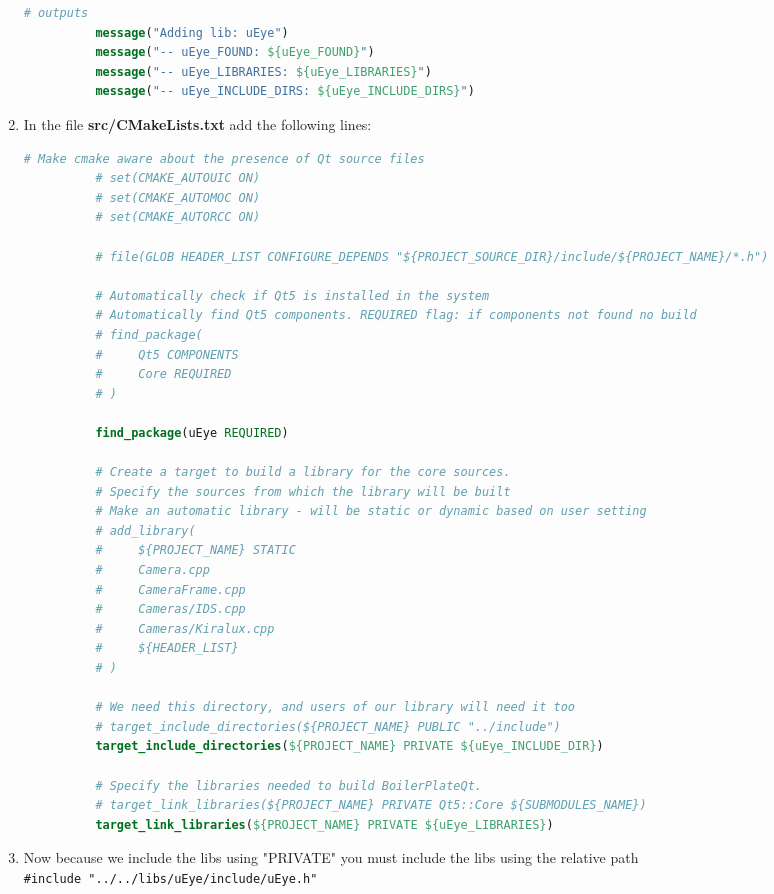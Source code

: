 \begin{enumerate}
\begin{lstlisting}[language=cmake, gobble=10]
          # outputs
          message("Adding lib: uEye")
          message("-- uEye_FOUND: ${uEye_FOUND}")
          message("-- uEye_LIBRARIES: ${uEye_LIBRARIES}")
          message("-- uEye_INCLUDE_DIRS: ${uEye_INCLUDE_DIRS}")
        \end{lstlisting}
  \item
        In the file \textbf{src/CMakeLists.txt} add the following lines:

        \begin{lstlisting}[language=cmake, gobble=10]
          # Make cmake aware about the presence of Qt source files
          # set(CMAKE_AUTOUIC ON)
          # set(CMAKE_AUTOMOC ON)
          # set(CMAKE_AUTORCC ON)

          # file(GLOB HEADER_LIST CONFIGURE_DEPENDS "${PROJECT_SOURCE_DIR}/include/${PROJECT_NAME}/*.h")

          # Automatically check if Qt5 is installed in the system
          # Automatically find Qt5 components. REQUIRED flag: if components not found no build
          # find_package(
          #     Qt5 COMPONENTS
          #     Core REQUIRED
          # )

          find_package(uEye REQUIRED)

          # Create a target to build a library for the core sources.
          # Specify the sources from which the library will be built
          # Make an automatic library - will be static or dynamic based on user setting
          # add_library(
          #     ${PROJECT_NAME} STATIC
          #     Camera.cpp
          #     CameraFrame.cpp
          #     Cameras/IDS.cpp
          #     Cameras/Kiralux.cpp
          #     ${HEADER_LIST}
          # )

          # We need this directory, and users of our library will need it too
          # target_include_directories(${PROJECT_NAME} PUBLIC "../include")
          target_include_directories(${PROJECT_NAME} PRIVATE ${uEye_INCLUDE_DIR})

          # Specify the libraries needed to build BoilerPlateQt.
          # target_link_libraries(${PROJECT_NAME} PRIVATE Qt5::Core ${SUBMODULES_NAME})
          target_link_libraries(${PROJECT_NAME} PRIVATE ${uEye_LIBRARIES})
        \end{lstlisting}
  \item
        Now because we include the libs using "PRIVATE" you must include the
        libs using the relative path
        \texttt{\#include\ "../../libs/uEye/include/uEye.h"}
\end{enumerate}